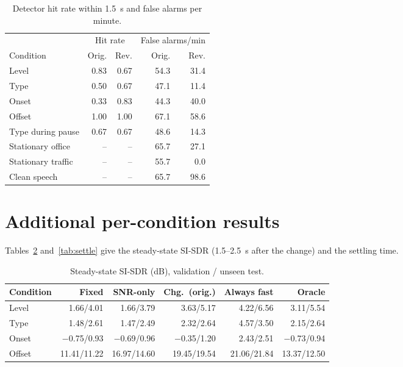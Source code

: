 \documentclass[10pt,conference,a4paper]{IEEEtran}
\begin{document}
\begin{table}[h]
\centering
\caption{Detector hit rate within 1.5~s and false alarms per minute.}
\label{tab:detcond}
\footnotesize
\begin{tabular}{@{}lrrrr@{}}
\toprule
& \multicolumn{2}{c}{Hit rate} & \multicolumn{2}{c}{False alarms/min}\\
\cmidrule(lr){2-3}\cmidrule(lr){4-5}
Condition & Orig. & Rev. & Orig. & Rev.\\
\midrule
Level & 0.83 & 0.67 & 54.3 & 31.4\\
Type & 0.50 & 0.67 & 47.1 & 11.4\\
Onset & 0.33 & 0.83 & 44.3 & 40.0\\
Offset & 1.00 & 1.00 & 67.1 & 58.6\\
Type during pause & 0.67 & 0.67 & 48.6 & 14.3\\
Stationary office & -- & -- & 65.7 & 27.1\\
Stationary traffic & -- & -- & 55.7 & 0.0\\
Clean speech & -- & -- & 65.7 & 98.6\\
\bottomrule
\end{tabular}
\end{table}

\section{Additional per-condition results}
\label{app:condition}
Tables~\ref{tab:steady} and~\ref{tab:settle} give the steady-state SI-SDR
(1.5--2.5~s after the change) and the settling time.

\begin{table}[h]
\centering
\caption{Steady-state SI-SDR (dB), validation / unseen test.}
\label{tab:steady}
\scriptsize
\setlength{\tabcolsep}{2pt}
\begin{tabular}{@{}lrrrrr@{}}
\toprule
Condition & Fixed & SNR-only & Chg.\ (orig.) & Always fast & Oracle\\
\midrule
Level & 1.66/4.01 & 1.66/3.79 & 3.63/5.17 & 4.22/6.56 & 3.11/5.54\\
Type & 1.48/2.61 & 1.47/2.49 & 2.32/2.64 & 4.57/3.50 & 2.15/2.64\\
Onset & $-$0.75/0.93 & $-$0.69/0.96 & $-$0.35/1.20 & 2.43/2.51 & $-$0.73/0.94\\
Offset & 11.41/11.22 & 16.97/14.60 & 19.45/19.54 & 21.06/21.84 & 13.37/12.50\\
\bottomrule
\end{tabular}
\end{table}
\end{document}
